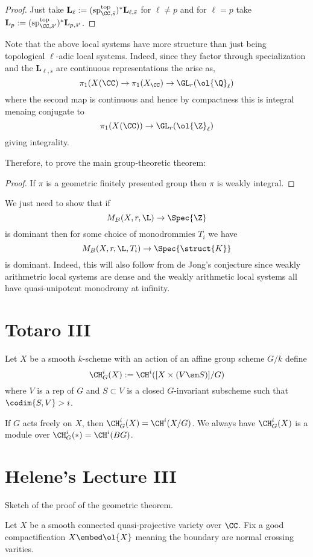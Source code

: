\documentclass{article}
\newcommand{\Qbar}{\ol{\Q}}
\newcommand{\LL}{\mathbf{L}}
\renewcommand{\top}{\mathrm{top}}
\begin{document}
\begin{proof}
Just take $\LL_{\ell} := (\sp_{\CC, \bar{s}}^{\top})^* \LL_{\ell, \bar{s}}$ for $\ell \neq p$ and for $\ell = p$ take $\LL_p := (\sp^{\top}_{\CC, \bar{s}'})^* \LL_{p, \bar{s}'}$. 
\end{proof}

Note that the above local systems have more structure than just being topological $\ell$-adic local systems. Indeed, since they factor through specialization and the $\LL_{\ell, \bar{s}}$ are continuous representations the arise as,
\[ \pi_1(X(\CC) \to \pi_1(X_{\CC}) \to \GL_r(\Qbar_\ell) \]
where the second map is continuous and hence by compactness this is integral menaing conjugate to
\[ \pi_1(X(\CC)) \to \GL_r(\ol{\Z}_\ell) \]
giving integrality. 
\par 
Therefore, to prove the main group-theoretic theorem:

\begin{proof}
If $\pi$ is a geometric finitely presented group then $\pi$ is weakly integral.
\end{proof}

We just need to show that if 
\[ M_B(X, r, \L) \to \Spec{\Z} \]
is dominant then for some choice of monodrommies $T_i$ we have
\[ M_B(X, r, \L, T_i) \to \Spec{\struct{K}} \]
is dominant. Indeed, this will also follow from de Jong's conjecture since weakly arithmetric local systems are dense and the weakly arithmetic local systems all have quasi-unipotent monodromy at infinity. 

\section{Totaro III}

\begin{defn}
Let $X$ be a smooth $k$-scheme with an action of an affine group scheme $G/k$ define
\[ \CH^i_G(X) := \CH^i([X \times (V \sm S)]/G) \]
where $V$ is a rep of $G$ and $S \subset V$ is a closed $G$-invariant subscheme such that $\codim{S, V} > i$.
\end{defn}

If $G$ acts freely on $X$, then $\CH^i_G(X) = \CH^i(X/G)$. We always have $\CH^i_G(X)$ is a module over $\CH^i_G(*) = \CH^i(BG)$. 

\section{Helene's Lecture III} 

Sketch of the proof of the geometric theorem.
\par 
Let $X$ be a smooth connected quasi-projective variety over $\CC$. Fix a good compactification $X \embed \ol{X}$ meaning the boundary are normal crossing varities.
\end{document}
